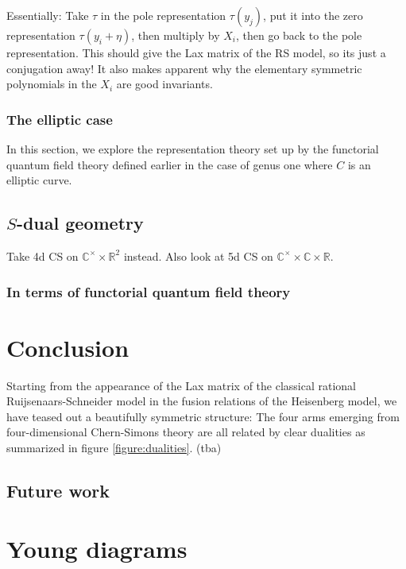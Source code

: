 \documentclass[11pt]{report}
\theoremstyle{definition}
\theoremstyle{remark}
\theoremstyle{remark}
\newcommand{\R}{\mathbb{R}}
\newcommand{\C}{\mathbb{C}}
\begin{document}
Essentially: Take $\tau$ in the pole representation $\tau(y_j)$, put it into the zero representation $\tau(y_i+\eta)$, then multiply by $X_i$, then go back to the pole representation. This should give the Lax matrix of the RS model, so its just a conjugation away! It also makes apparent why the elementary symmetric polynomials in the $X_i$ are good invariants.

\subsection{The elliptic case}

In this section, we explore the representation theory set up by the functorial quantum field theory defined earlier in the case of genus one where $C$ is an elliptic curve.

\section{$S$-dual geometry}

Take 4d CS on $\C^\times \times \R^2$ instead. Also look at 5d CS on $\C^\times \times \C \times \R$.

\subsection{In terms of functorial quantum field theory}

\chapter{Conclusion}\label{chapter:conclusion}

Starting from the appearance of the Lax matrix of the classical rational Ruijsenaars-Schneider model in the fusion relations of the Heisenberg model, we have teased out a beautifully symmetric structure: The four arms emerging from four-dimensional Chern-Simons theory are all related by clear dualities as summarized in figure \ref{figure:dualities}. (tba)

\section*{Future work}



\appendix \label{appendix}

\chapter{Young diagrams} \label{appendix:youngdiagrams}
\end{document}
